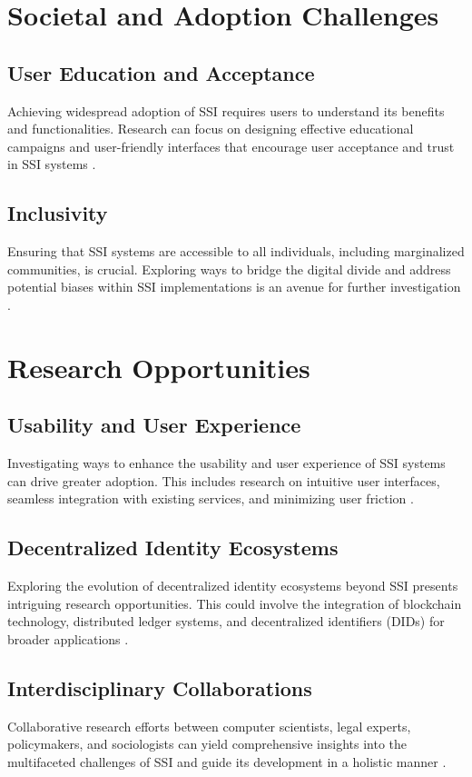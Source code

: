\section*{Societal and Adoption Challenges}
\subsection*{User Education and Acceptance}Achieving widespread adoption of SSI requires users to understand its benefits and functionalities. Research can focus on designing effective educational campaigns and user-friendly interfaces that encourage user acceptance and trust in SSI systems \cite{506}.
\subsection*{Inclusivity} Ensuring that SSI systems are accessible to all individuals, including marginalized communities, is crucial. Exploring ways to bridge the digital divide and address potential biases within SSI implementations is an avenue for further investigation \cite{507}.

\section*{Research Opportunities}
\subsection*{Usability and User Experience} Investigating ways to enhance the usability and user experience of SSI systems can drive greater adoption. This includes research on intuitive user interfaces, seamless integration with existing services, and minimizing user friction \cite{508}.
\subsection*{Decentralized Identity Ecosystems} Exploring the evolution of decentralized identity ecosystems beyond SSI presents intriguing research opportunities. This could involve the integration of blockchain technology, distributed ledger systems, and decentralized identifiers (DIDs) for broader applications \cite{509}.
\subsection*{Interdisciplinary Collaborations} Collaborative research efforts between computer scientists, legal experts, policymakers, and sociologists can yield comprehensive insights into the multifaceted challenges of SSI and guide its development in a holistic manner \cite{510}.

